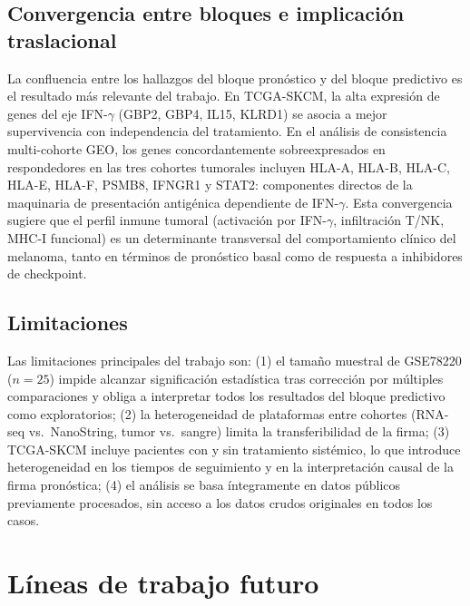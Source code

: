 \subsection{Convergencia entre bloques e implicación traslacional}

La confluencia entre los hallazgos del bloque pronóstico y del bloque predictivo es el resultado más relevante del trabajo. En TCGA-SKCM, la alta expresión de genes del eje IFN-$\gamma$ (GBP2, GBP4, IL15, KLRD1) se asocia a mejor supervivencia con independencia del tratamiento. En el análisis de consistencia multi-cohorte GEO, los genes concordantemente sobreexpresados en respondedores en las tres cohortes tumorales incluyen HLA-A, HLA-B, HLA-C, HLA-E, HLA-F, PSMB8, IFNGR1 y STAT2: componentes directos de la maquinaria de presentación antigénica dependiente de IFN-$\gamma$. Esta convergencia sugiere que el perfil inmune tumoral (activación por IFN-$\gamma$, infiltración T/NK, MHC-I funcional) es un determinante transversal del comportamiento clínico del melanoma, tanto en términos de pronóstico basal como de respuesta a inhibidores de checkpoint.

\subsection{Limitaciones}

Las limitaciones principales del trabajo son: (1) el tamaño muestral de GSE78220 ($n = 25$) impide alcanzar significación estadística tras corrección por múltiples comparaciones y obliga a interpretar todos los resultados del bloque predictivo como exploratorios; (2) la heterogeneidad de plataformas entre cohortes (RNA-seq vs.\ NanoString, tumor vs.\ sangre) limita la transferibilidad de la firma; (3) TCGA-SKCM incluye pacientes con y sin tratamiento sistémico, lo que introduce heterogeneidad en los tiempos de seguimiento y en la interpretación causal de la firma pronóstica; (4) el análisis se basa íntegramente en datos públicos previamente procesados, sin acceso a los datos crudos originales en todos los casos.

\section{Líneas de trabajo futuro}

